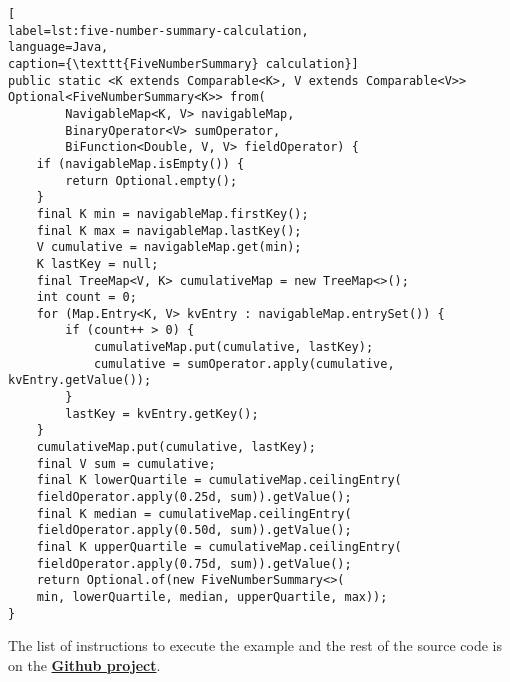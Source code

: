 \documentclass{article}
\begin{document}
\begin{lstlisting}[
label=lst:five-number-summary-calculation,
language=Java,
caption={\texttt{FiveNumberSummary} calculation}]
public static <K extends Comparable<K>, V extends Comparable<V>>
Optional<FiveNumberSummary<K>> from(
        NavigableMap<K, V> navigableMap,
        BinaryOperator<V> sumOperator,
        BiFunction<Double, V, V> fieldOperator) {
    if (navigableMap.isEmpty()) {
        return Optional.empty();
    }
    final K min = navigableMap.firstKey();
    final K max = navigableMap.lastKey();
    V cumulative = navigableMap.get(min);
    K lastKey = null;
    final TreeMap<V, K> cumulativeMap = new TreeMap<>();
    int count = 0;
    for (Map.Entry<K, V> kvEntry : navigableMap.entrySet()) {
        if (count++ > 0) {
            cumulativeMap.put(cumulative, lastKey);
            cumulative = sumOperator.apply(cumulative, kvEntry.getValue());
        }
        lastKey = kvEntry.getKey();
    }
    cumulativeMap.put(cumulative, lastKey);
    final V sum = cumulative;
    final K lowerQuartile = cumulativeMap.ceilingEntry(
    fieldOperator.apply(0.25d, sum)).getValue();
    final K median = cumulativeMap.ceilingEntry(
    fieldOperator.apply(0.50d, sum)).getValue();
    final K upperQuartile = cumulativeMap.ceilingEntry(
    fieldOperator.apply(0.75d, sum)).getValue();
    return Optional.of(new FiveNumberSummary<>(
    min, lowerQuartile, median, upperQuartile, max));
}
\end{lstlisting}

The list of instructions to execute the example and the rest of the source code is on the \href{https://github.com/julatec/utils/blob/master/src/test/java/name/julatec/util/statistics/BoxPlotTee.md}{\textbf{Github project}}.


\medskip

\end{document}
